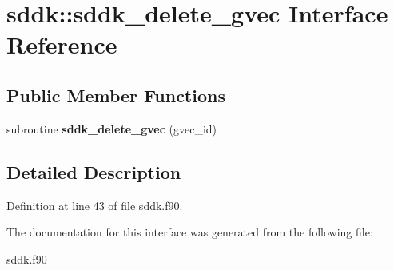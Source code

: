 \hypertarget{interfacesddk_1_1sddk__delete__gvec}{}\section{sddk\+:\+:sddk\+\_\+delete\+\_\+gvec Interface Reference}
\label{interfacesddk_1_1sddk__delete__gvec}
\subsection*{Public Member Functions}
\begin{DoxyCompactItemize}
\item 
\hypertarget{interfacesddk_1_1sddk__delete__gvec_a4327c157bfdb3e7996bc9f680f77720e}{}subroutine {\bfseries sddk\+\_\+delete\+\_\+gvec} (gvec\+\_\+id)\label{interfacesddk_1_1sddk__delete__gvec_a4327c157bfdb3e7996bc9f680f77720e}

\end{DoxyCompactItemize}


\subsection{Detailed Description}


Definition at line 43 of file sddk.\+f90.



The documentation for this interface was generated from the following file\+:\begin{DoxyCompactItemize}
\item 
sddk.\+f90\end{DoxyCompactItemize}
